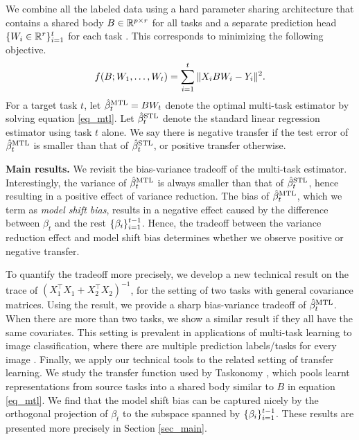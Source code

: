 We combine all the labeled data using a hard parameter sharing architecture that contains a shared body $B\in\mathbb{R}^{p\times r}$ for all tasks and a separate prediction head $\{W_i \in \mathbb{R}^{r}\}_{i=1}^t$ for each task \cite{R17,MTDNN19,WZR20}.
This corresponds to minimizing the following objective.
\begin{align}
	\label{eq_mtl}
	f(B; W_1, \dots, W_t) = \sum_{i=1}^t \|X_i B W_i - Y_i\|^2.
\end{align}
For a target task $t$,
let $\hat{\beta}_t^{\text{MTL}} = B W_t$ denote the optimal multi-task estimator by solving equation \eqref{eq_mtl}.
Let $\hat{\beta}_t^{\text{STL}}$ denote the standard linear regression estimator using task $t$ alone.
We say there is negative transfer if the test error of $\hat{\beta}_t^{\text{MTL}}$  is smaller than that of $\hat{\beta}_t^{\text{STL}}$, or positive transfer otherwise.

\textbf{Main results.}
We revisit the bias-variance tradeoff of the multi-task estimator.
Interestingly, the variance of $\hat{\beta}_t^{\text{MTL}}$ is always smaller than that of $\hat{\beta}_t^{\text{STL}}$, hence resulting in a positive effect of variance reduction.
The bias of $\hat{\beta}_t^{\text{MTL}}$, which we term as \textit{model shift bias}, results in a negative effect caused by the difference between $\beta_t$ and the rest $\{\beta_i\}_{i=1}^{t-1}$.
Hence, the tradeoff between the variance reduction effect and model shift bias determines whether we observe positive or negative transfer.



To quantify the tradeoff more precisely, we develop a new technical result on the trace of $(X_1^{\top}X_1 + X_2^{\top}X_2)^{-1}$, for the setting of two tasks with general covariance matrices.
Using the result, we provide a sharp bias-variance tradeoff of $\hat{\beta}_t^{\text{MTL}}$.
When there are more than two tasks, we show a similar result if they all have the same covariates.
This setting is prevalent in applications of multi-task learning to image classification, where there are multiple prediction labels/tasks for every image \cite{chexnet17,EA20}.
Finally, we apply our technical tools to the related setting of transfer learning.
We study the transfer function used by Taskonomy \cite{ZSSGM18}, which pools learnt representations from source tasks into a shared body similar to $B$ in equation \eqref{eq_mtl}.
We find that the model shift bias can be captured nicely by the orthogonal projection of $\beta_t$ to the subspace spanned by $\{\beta_i\}_{i=1}^{t-1}$.
These results are presented more precisely in Section \ref{sec_main}.



